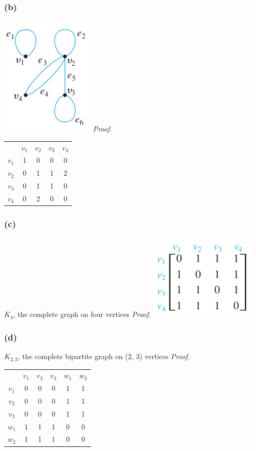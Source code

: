 \documentclass[14pt]{extarticle}
\newcommand{\cy}{\color{cyan}}
\begin{document}
\subsubsection{(b)}
\includegraphics[scale=0.6]{../images/10.2.4.b.1.png}
{\it Proof.}
\begin{tabular}{ccccc}
 & {\cy \(v_1\)} & {\cy \(v_2\)} & {\cy \(v_3\)} & {\cy \(v_4\)} \\
{\cy \(v_1\)} & 1 & 0 & 0 & 0 \\
{\cy \(v_2\)} & 0 & 1 & 1 & 2 \\
{\cy \(v_3\)} & 0 & 1 & 1 & 0 \\
{\cy \(v_4\)} & 0 & 2 & 0 & 0 \\
\end{tabular}

\subsubsection{(c)}
\(K_4\), the complete graph on four vertices
{\it Proof.} \includegraphics[scale=0.6]{../images/10.2.4.c.png}

\subsubsection{(d)}
\(K_{2,3}\), the complete bipartite graph on (2, 3) vertices
{\it Proof.}
\begin{tabular}{cccccc}
 & {\cy \(v_1\)} & {\cy \(v_2\)} & {\cy \(v_3\)} & {\cy \(w_1\)} & {\cy \(w_2\)} \\
{\cy \(v_1\)} & 0 & 0 & 0 & 1 & 1 \\
{\cy \(v_2\)} & 0 & 0 & 0 & 1 & 1 \\
{\cy \(v_3\)} & 0 & 0 & 0 & 1 & 1 \\
{\cy \(w_1\)} & 1 & 1 & 1 & 0 & 0 \\
{\cy \(w_2\)} & 1 & 1 & 1 & 0 & 0 \\
\end{tabular}
\end{document}
